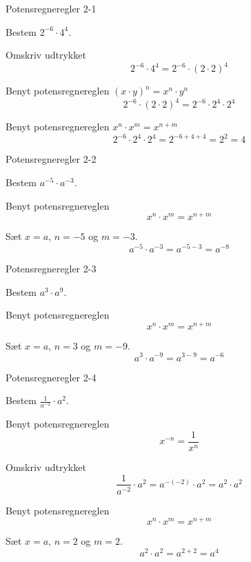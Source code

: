 \documentclass{article}
\begin{document}
\tableofcontents
\newpage

\begin{exercise}{Potensregneregler 2-1}

Bestem $2^{-6} \cdot 4^4$.


\hint 
Omskriv udtrykket
\[
2^{-6} \cdot 4^4 = 2^{-6} \cdot (2 \cdot 2)^4
\]

\hint

Benyt potensregnereglen $(x \cdot y)^n = x^n \cdot y^n$
\[
2^{-6} \cdot (2 \cdot 2)^4 = 2^{-6} \cdot 2^4 \cdot 2^4
\]

\hint
Benyt potensregnereglen $ x^n \cdot x^m  = x^{n+m}$
\[
2^{-6} \cdot 2^4 \cdot 2^4 = 2^{-6+4+4} = 2^2  = 4
\]

\end{exercise}

\newpage

\begin{exercise}{Potensregneregler 2-2}
	
	Bestem $a^{-5} \cdot a^{-3}$.
	
	
	\hint
	
	Benyt potensregnereglen 
	\[
	x^n \cdot x^m  = x^{n+m}
	\] 
	\hint 
	
	Sæt $x=a$, $n=-5$ og $m=-3$.
	\[
	a^{-5} \cdot a^{-3} = a^{-5-3} = a^{-8}
	\]
	
\end{exercise}

\newpage

\begin{exercise}{Potensregneregler 2-3}
	
	Bestem $a^{3} \cdot a^{9}$.
	
	
	\hint
	Benyt potensregnereglen 
	\[
	x^n \cdot x^m  = x^{n+m}
	\] 
	
	\hint 
	
	Sæt $x=a$, $n=3$ og $m=-9$.
	\[
	a^{3} \cdot a^{-9} = a^{3-9} = a^{-6}
	\]
	
\end{exercise}

\newpage

\begin{exercise}{Potensregneregler 2-4}
	
	Bestem $\frac{1}{a^{-2}} \cdot a^{2}$.
	
	
	\hint
	Benyt potensregnereglen 
	\[
	 x^{-n} = \frac{1}{x^{n}} 
	\]
	
	\hint 
	
	Omskriv udtrykket
	\[
	\frac{1}{a^{-2}} \cdot a^{2} = a^{-(-2)} \cdot a^2 	= a^2 \cdot a^2
	\]
	
	\hint
	Benyt potensregnereglen 
	\[
	x^n \cdot x^m  = x^{n+m}
	\]
	
	\hint 
	
	Sæt $x=a$, $n=2$ og $m=2$.
	\[
	a^{2} \cdot a^{2} = a^{2+2} = a^{4}
	\]
	
\end{exercise}
\end{document}
